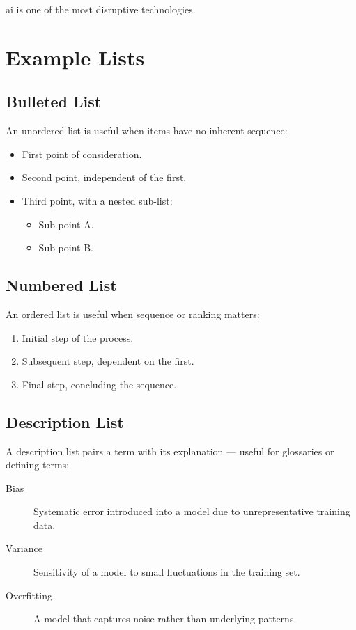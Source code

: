 \Gls{ai} is one of the most disruptive technologies.


\section{Example Lists}

\subsection{Bulleted List}

An unordered list is useful when items have no inherent sequence:

\begin{itemize}
	\item First point of consideration.
	\item Second point, independent of the first.
	\item Third point, with a nested sub-list:
	\begin{itemize}
		\item Sub-point A.
		\item Sub-point B.
	\end{itemize}
\end{itemize}

\subsection{Numbered List}

An ordered list is useful when sequence or ranking matters:

\begin{enumerate}
	\item Initial step of the process.
	\item Subsequent step, dependent on the first.
	\item Final step, concluding the sequence.
\end{enumerate}

\subsection{Description List}

A description list pairs a term with its explanation — useful for glossaries or defining terms:

\begin{description}
	\item[Bias] Systematic error introduced into a model due to unrepresentative training data.
	\item[Variance] Sensitivity of a model to small fluctuations in the training set.
	\item[Overfitting] A model that captures noise rather than underlying patterns.
\end{description}

